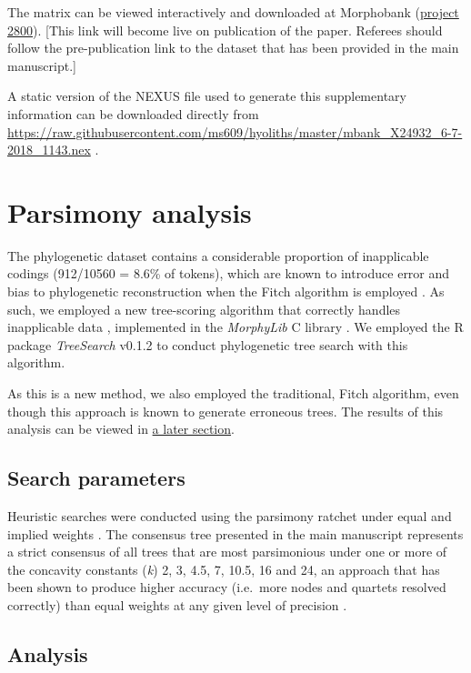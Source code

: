 \documentclass[openany]{book}
\theoremstyle{definition}
\theoremstyle{definition}
\theoremstyle{definition}
\theoremstyle{remark}
\begin{document}
The matrix can be viewed interactively and downloaded at Morphobank
(\href{https://morphobank.org/permalink/?P2800}{project 2800}). {[}This
link will become live on publication of the paper. Referees should
follow the pre-publication link to the dataset that has been provided in
the main manuscript.{]}

A static version of the NEXUS file used to generate this supplementary
information can be downloaded directly from
\url{https://raw.githubusercontent.com/ms609/hyoliths/master/mbank_X24932_6-7-2018_1143.nex}
.

\hypertarget{treesearch}{\chapter{Parsimony analysis}\label{treesearch}}

The phylogenetic dataset contains a considerable proportion of
inapplicable codings (912/10560 = 8.6\% of tokens), which are known to
introduce error and bias to phylogenetic reconstruction when the Fitch
algorithm is employed \citep{Maddison1993, Brazeau2018}. As such, we
employed a new tree-scoring algorithm that correctly handles
inapplicable data \citep{Brazeau2018}, implemented in the
\emph{MorphyLib} C library \citep{Brazeau2017Morphylib}. We employed the
R package \emph{TreeSearch} v0.1.2 \citep{Smith2018TreeSearch} to
conduct phylogenetic tree search with this algorithm.

As this is a new method, we also employed the traditional, Fitch
algorithm, even though this approach is known to generate erroneous
trees. The results of this analysis can be viewed in
\protect\hyperlink{fitch}{a later section}.

\section{Search parameters}\label{search-parameters}

Heuristic searches were conducted using the parsimony ratchet
\citep{Nixon1999} under equal and implied weights \citep{Goloboff1997}.
The consensus tree presented in the main manuscript represents a strict
consensus of all trees that are most parsimonious under one or more of
the concavity constants (\emph{k}) 2, 3, 4.5, 7, 10.5, 16 and 24, an
approach that has been shown to produce higher accuracy (i.e.~more nodes
and quartets resolved correctly) than equal weights at any given level
of precision \citep{Smith2017}.

\section{Analysis}\label{analysis}
\end{document}
